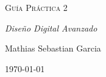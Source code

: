 \documentclass{article}
\begin{document}
\begin{titlepage}
    \centering
    \vspace{4cm}
    {\scshape\Huge Guía Práctica 2\par}
    \vspace{3cm}
    {\itshape\Large Diseño Digital Avanzado \par}
    \vfill
    {\Large Mathias Sebastian Garcia\par}
    \vfill
    {\Large \today\par}
\end{titlepage}

\tableofcontents





 
\end{document}
